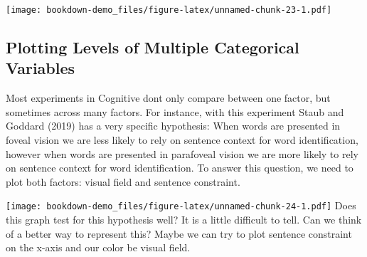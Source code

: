 \documentclass[]{book}
\newenvironment{Shaded}{\begin{snugshade}}{\end{snugshade}}
\newcommand{\KeywordTok}[1]{\textcolor[rgb]{0.13,0.29,0.53}{\textbf{#1}}}
\newcommand{\DataTypeTok}[1]{\textcolor[rgb]{0.13,0.29,0.53}{#1}}
\newcommand{\DecValTok}[1]{\textcolor[rgb]{0.00,0.00,0.81}{#1}}
\newcommand{\StringTok}[1]{\textcolor[rgb]{0.31,0.60,0.02}{#1}}
\newcommand{\OperatorTok}[1]{\textcolor[rgb]{0.81,0.36,0.00}{\textbf{#1}}}
\newcommand{\NormalTok}[1]{#1}
\begin{document}
\texttt{[image: bookdown-demo\_files/figure-latex/unnamed-chunk-23-1.pdf]}

\subsection{Plotting Levels of Multiple Categorical
Variables}\label{plotting-levels-of-multiple-categorical-variables}

Most experiments in Cognitive dont only compare between one factor, but
sometimes across many factors. For instance, with this experiment Staub
and Goddard (2019) has a very specific hypothesis: When words are
presented in foveal vision we are less likely to rely on sentence
context for word identification, however when words are presented in
parafoveal vision we are more likely to rely on sentence context for
word identification. To answer this question, we need to plot both
factors: visual field and sentence constraint.

\begin{Shaded}
\end{Shaded}

\texttt{[image: bookdown-demo\_files/figure-latex/unnamed-chunk-24-1.pdf]}
Does this graph test for this hypothesis well? It is a little difficult
to tell. Can we think of a better way to represent this? Maybe we can
try to plot sentence constraint on the x-axis and our color be visual
field.
\end{document}
